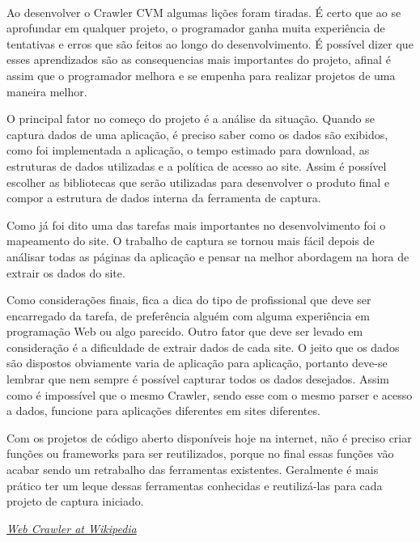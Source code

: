 \documentclass[a4paper, 12pt]{article}
\begin{document}
\paragraph{}Ao desenvolver o Crawler CVM algumas lições foram
tiradas. É certo que ao se aprofundar em qualquer projeto, o
programador ganha muita experiência de tentativas e erros que são
feitos ao longo do desenvolvimento. É possível dizer que esses
aprendizados são as consequencias mais importantes do projeto, afinal
é assim que o programador melhora e se empenha para realizar projetos
de uma maneira melhor.

O principal fator no começo do projeto é a análise da situação. Quando
se captura dados de uma aplicação, é preciso saber como os dados são
exibidos, como foi implementada a aplicação, o tempo estimado para
download, as estruturas de dados utilizadas e a política de acesso ao
site. Assim é possível escolher as bibliotecas que serão utilizadas
para desenvolver o produto final e compor a estrutura de dados interna
da ferramenta de captura.

Como já foi dito uma das tarefas mais importantes no desenvolvimento
foi o mapeamento do site. O trabalho de captura se tornou mais fácil
depois de análisar todas as páginas da aplicação e pensar na melhor
abordagem na hora de extrair os dados do site.

Como considerações finais, fica a dica do tipo de profissional que
deve ser encarregado da tarefa, de preferência alguém com alguma
experiência em programação Web ou algo parecido. Outro fator que deve
ser levado em consideração é a dificuldade de extrair dados de cada
site. O jeito que os dados são dispostos obviamente varia de aplicação
para aplicação, portanto deve-se lembrar que nem sempre é possível
capturar todos os dados desejados. Assim como é impossível que o mesmo
Crawler, sendo esse com o mesmo parser e acesso a dados, funcione para
aplicações diferentes em sites diferentes.

Com os projetos de código aberto disponíveis hoje na internet, não é
preciso criar funções ou frameworks para ser reutilizados, porque no
final essas funções vão acabar sendo um retrabalho das ferramentas
existentes. Geralmente é mais prático ter um leque dessas ferramentas
conhecidas e reutilizá-las para cada projeto de captura iniciado.

\begin{thebibliography}{9}
 \emph{
  \href{http://en.wikipedia.org/wiki/Web_crawler}{Web Crawler at
    Wikipedia}}

\end{thebibliography}
\end{document}
